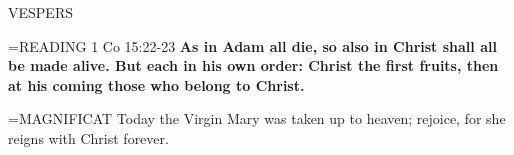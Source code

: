 \begin{flushleft}\normalsize VESPERS\\\end{flushleft}

\hangindent=\parindent \small{READING} 1 Co 15:22-23 \textbf{As in Adam all die, so also in Christ shall all be
made alive. But each in his own order: Christ the first fruits, then
at his coming those who belong to Christ.\\}
 
\hangindent=\parindent \small{MAGNIFICAT  Today the Virgin Mary was taken up to heaven;
rejoice, for she reigns with Christ forever.\\}
 
